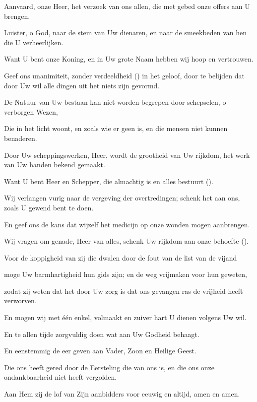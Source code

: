 \documentclass[12pt,twoside,a5paper]{article}
\begin{document}
\begin{halfparskip}

  Aanvaard, onze Heer, het verzoek van ons allen, die met gebed onze offers aan U brengen.

  Luister, o God, naar de stem van Uw dienaren, en naar de smeekbeden van hen die U verheerlijken.

  Want U bent onze Koning, en in Uw grote Naam hebben wij hoop en vertrouwen.

  Geef ons unanimiteit, zonder verdeeldheid () in het geloof, door te belijden dat door Uw wil alle dingen uit het niets zijn gevormd.

  De Natuur van Uw bestaan kan niet worden begrepen door schepselen, o verborgen Wezen,

  Die in het licht woont, en zoals wie er geen is, en die mensen niet kunnen benaderen.

  Door Uw scheppingswerken, Heer, wordt de grootheid van Uw rijkdom, het werk van Uw handen bekend gemaakt.

  Want U bent Heer en Schepper, die almachtig is en alles bestuurt ().

  Wij verlangen vurig naar de vergeving der overtredingen; schenk het aan ons, zoals U gewend bent te doen.

  En geef ons de kans dat wijzelf het medicijn op onze wonden mogen aanbrengen.

  Wij vragen om genade, Heer van alles, schenk Uw rijkdom aan onze behoefte ().

  Voor de koppigheid van zij die dwalen door de fout van de list van de vijand

  moge Uw barmhartigheid hun gids zijn; en de weg vrijmaken voor hun geweten,

  zodat zij weten dat het door Uw zorg is dat ons gevangen ras de vrijheid heeft verworven.

  En mogen wij met één enkel, volmaakt en zuiver hart U dienen volgens Uw wil.

  En te allen tijde zorgvuldig doen wat aan Uw Godheid behaagt.

  En eenstemmig de eer geven aan Vader, Zoon en Heilige Geest.

  Die ons heeft gered door de Eersteling die van ons is, en die ons onze ondankbaarheid niet heeft vergolden.

  Aan Hem zij de lof van Zijn aanbidders voor eeuwig en altijd, amen en amen.
\end{halfparskip}
\end{document}
